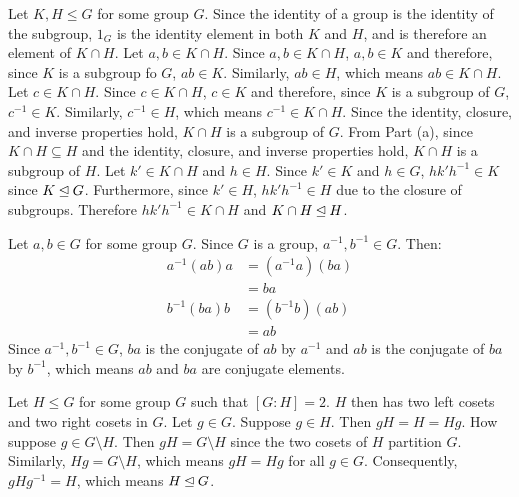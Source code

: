 \documentclass{article}
\begin{document}
\clearpage

Let $K, H \leq G$ for some group $G$. Since the identity of a group is the identity of the subgroup, $1_G$ is the identity element in both $K$ and $H$, and is therefore an element of $K \cap H$. Let $a, b \in K \cap H$. Since $a, b \in K \cap H$, $a, b \in K$ and therefore, since $K$ is a subgroup fo $G$, $ab \in K$. Similarly, $ab \in H$, which means $ab \in K \cap H$. Let $c \in K \cap H$. Since $c \in K \cap H$, $c \in K$ and therefore, since $K$ is a subgroup of $G$, $c^{-1} \in K$. Similarly, $c^{-1} \in H$, which means $c^{-1} \in K \cap H$. Since the identity, closure, and inverse properties hold, $K \cap H$ is a subgroup of $G$.
From Part (a), since $K \cap H \subseteq H$ and the identity, closure, and inverse properties hold, $K \cap H$ is a subgroup of $H$. Let $k' \in K \cap H$ and $h \in H$. Since $k' \in K$ and $h \in G$, $hk'h^{-1} \in K$ since $K \unlhd G$. Furthermore, since $k' \in H$, $hk'h^{-1} \in H$ due to the closure of subgroups. Therefore $hk'h^{-1} \in K \cap H$ and $K \cap H \unlhd H$.

\clearpage

Let $a, b \in G$ for some group $G$. Since $G$ is a group, $a^{-1}, b^{-1} \in G$. Then:
\begin{equation}
    \begin{split}
        a^{-1}\left(ab\right)a & = \left(a^{-1}a\right)\left(ba\right) \\
        & = ba \\
        b^{-1}\left(ba\right)b & = \left(b^{-1}b\right)\left(ab\right) \\
        & = ab
    \end{split}
\end{equation}
Since $a^{-1}, b^{-1} \in G$, $ba$ is the conjugate of $ab$ by $a^{-1}$ and $ab$ is the conjugate of $ba$ by $b^{-1}$, which means $ab$ and $ba$ are conjugate elements.

\clearpage

Let $H \leq G$ for some group $G$ such that $[G : H] = 2$. $H$ then has two left cosets and two right cosets in $G$. Let $g \in G$. Suppose $g \in H$. Then $gH = H = Hg$. How suppose $g \in G \setminus H$. Then $gH = G \setminus H$ since the two cosets of $H$ partition $G$. Similarly, $Hg = G \setminus H$, which means $gH = Hg$ for all $g \in G$. Consequently, $gHg^{-1} = H$, which means $H \unlhd G$.
\end{document}
